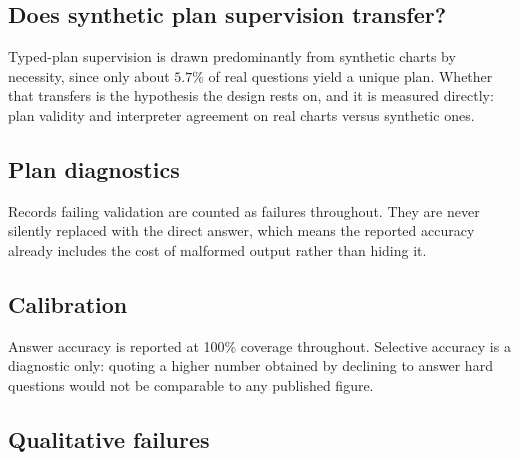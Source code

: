 \subsection{Does synthetic plan supervision transfer?}

Typed-plan supervision is drawn predominantly from synthetic charts by necessity, since only about
$5.7\%$ of real questions yield a unique plan. Whether that transfers is the hypothesis the design
rests on, and it is measured directly: plan validity and interpreter agreement on real charts versus
synthetic ones.


\subsection{Plan diagnostics}


Records failing validation are counted as failures throughout. They are never silently replaced with
the direct answer, which means the reported accuracy already includes the cost of malformed output
rather than hiding it.

\subsection{Calibration}




Answer accuracy is reported at 100\% coverage throughout. Selective accuracy is a diagnostic only:
quoting a higher number obtained by declining to answer hard questions would not be comparable to
any published figure.

\subsection{Qualitative failures}




